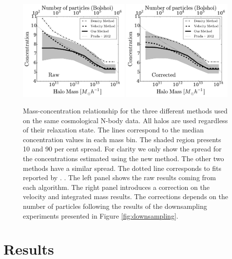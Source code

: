 \documentclass{emulateapj}
\begin{document}
\begin{figure}
\begin{center}
  \includegraphics[width=0.49\textwidth]{concentration_bolshoi.pdf}
  \includegraphics[width=0.49\textwidth]{concentration_bolshoi_corrected.pdf}
\end{center}
\vspace{-0.5cm}
\caption{Mass-concentration relationship for the three different
  methods used on the same cosmological N-body data.  All halos are
  used regardless of their relaxation state.  The lines correspond to
  the median concentration values in each mass bin.  The shaded region
  presents 10 and 90 per cent spread.  For clarity we only show the
  spread for the concentrations estimated using the new method. The
  other two methods have a similar spread. The dotted line corresponds
  to fits reported by \citep{Prada2012}.
  \label{fig:concentration}. The left panel shows the raw results
  coming from each algorithm. The right panel introduces a
  correction on the velocity and integrated mass results. 
  The corrections depends on the number of particles following the
  results of the downsampling experiments presented in Figure
  \ref{fig:downsampling}.} 
\end{figure}


\section{Results}
\label{sec:results}
\end{document}
